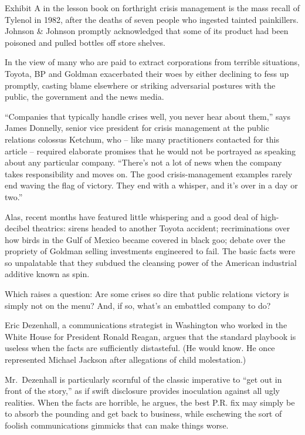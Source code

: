 ﻿\documentclass[12pt]{article}
\begin{document}
Exhibit A in the lesson book on forthright crisis management is the mass recall of Tylenol in 1982,
after the deaths of seven people who ingested tainted painkillers. Johnson \& Johnson promptly
acknowledged that some of its product had been poisoned and pulled bottles off store shelves.

In the view of many who are paid to extract corporations from terrible situations, Toyota, BP and
Goldman exacerbated their woes by either declining to fess up promptly, casting blame elsewhere or
striking adversarial postures with the public, the government and the news media.

``Companies that typically handle crises well, you never hear about them,'' says James Donnelly,
senior vice president for crisis management at the public relations colossus Ketchum, who -- like
many practitioners contacted for this article -- required elaborate promises that he would not be
portrayed as speaking about any particular company. ``There's not a lot of news when the company
takes responsibility and moves on. The good crisis-management examples rarely end waving the flag of
victory. They end with a whisper, and it's over in a day or two.''

Alas, recent months have featured little whispering and a good deal of high-decibel theatrics:
sirens headed to another Toyota accident; recriminations over how birds in the Gulf of Mexico became
covered in black goo; debate over the propriety of Goldman selling investments engineered to fail.
The basic facts were so unpalatable that they subdued the cleansing power of the American industrial
additive known as spin.

Which raises a question: Are some crises so dire that public relations victory is simply not on the
menu? And, if so, what's an embattled company to do?

Eric Dezenhall, a communications strategist in Washington who worked in the White House for
President Ronald Reagan, argues that the standard playbook is useless when the facts are
sufficiently distasteful. (He would know. He once represented Michael Jackson after allegations of
child molestation.)

Mr.~Dezenhall is particularly scornful of the classic imperative to ``get out in front of the
story,'' as if swift disclosure provides inoculation against all ugly realities. When the facts are
horrible, he argues, the best P.R. fix may simply be to absorb the pounding and get back to
business, while eschewing the sort of foolish communications gimmicks that can make things worse.
\end{document}
